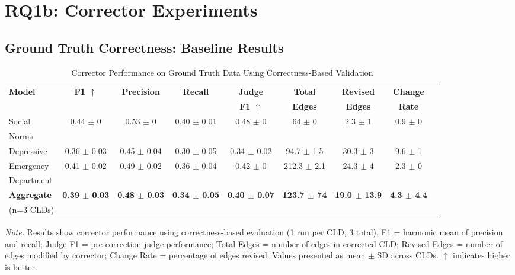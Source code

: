 \documentclass{article}
\begin{document}
\section{RQ1b: Corrector Experiments}

\subsection{Ground Truth Correctness: Baseline Results}

\begin{table}[htbp]
\centering
\caption{Corrector Performance on Ground Truth Data Using Correctness-Based Validation}
\label{tab:rq1b_groundtruth_correctness}
\begin{threeparttable}
\begin{tabular}{lcccccccc}
\toprule
\textbf{Model} & \textbf{F1 $\uparrow$} & \textbf{Precision} & \textbf{Recall} & \textbf{Judge} & \textbf{Total} & \textbf{Revised} & \textbf{Change} \\
 & & & & \textbf{F1 $\uparrow$} & \textbf{Edges} & \textbf{Edges} & \textbf{Rate} \\
\midrule
Social        & 0.44 $\pm$ 0 & 0.53 $\pm$ 0 & 0.40 $\pm$ 0.01 & 0.48 $\pm$ 0 & 64 $\pm$ 0 & 2.3 $\pm$ 1 & 0.9 $\pm$ 0 \\
Norms         &              &              &                 &               &            &              &             \\
\midrule
Depressive    & 0.36 $\pm$ 0.03 & 0.45 $\pm$ 0.04 & 0.30 $\pm$ 0.05 & 0.34 $\pm$ 0.02 & 94.7 $\pm$ 1.5 & 30.3 $\pm$ 3 & 9.6 $\pm$ 1 \\
\midrule
Emergency     & 0.41 $\pm$ 0.02 & 0.49 $\pm$ 0.02 & 0.36 $\pm$ 0.04 & 0.42 $\pm$ 0 & 212.3 $\pm$ 2.1 & 24.3 $\pm$ 4 & 2.3 $\pm$ 0 \\
Department    &              &              &                 &               &            &              &             \\
\midrule
\textbf{Aggregate} & \textbf{0.39 $\pm$ 0.03} & \textbf{0.48 $\pm$ 0.03} & \textbf{0.34 $\pm$ 0.05} & \textbf{0.40 $\pm$ 0.07} & \textbf{123.7 $\pm$ 74} & \textbf{19.0 $\pm$ 13.9} & \textbf{4.3 $\pm$ 4.4} \\
(n=3 CLDs)    &              &              &                 &               &            &              &             \\
\bottomrule
\end{tabular}
\begin{tablenotes}
\small
\item \textit{Note.} Results show corrector performance using correctness-based evaluation (1 run per CLD, 3 total). 
F1 = harmonic mean of precision and recall; Judge F1 = pre-correction judge performance; Total Edges = number of edges in corrected CLD; 
Revised Edges = number of edges modified by corrector; Change Rate = percentage of edges revised. 
Values presented as mean $\pm$ SD across CLDs. $\uparrow$ indicates higher is better.
\end{tablenotes}
\end{threeparttable}
\end{table}
\end{document}
